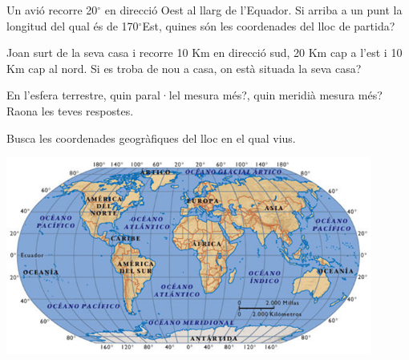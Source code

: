 \begin{mylist}
\exer Un avió recorre 20${}^\circ$ en direcció Oest al llarg de l'Equador. Si arriba a un punt la longitud del qual és de 170${}^\circ$Est, quines són les coordenades del lloc de partida?


\exer  Joan surt de la seva casa i recorre 10 Km en direcció sud, 20 Km cap a l'est i 10 Km cap al nord. Si es troba de nou a casa, on està situada la seva casa?


\exer  En l'esfera terrestre, quin paral·lel mesura més?, quin meridià mesura més? Raona les teves respostes.


\exer  Busca les coordenades geogràfiques del lloc en el qual vius.


\begin{center}
 \includegraphics*[width=12cm]{img-11/planisferi.png} 
\end{center} 

 
\end{mylist}



